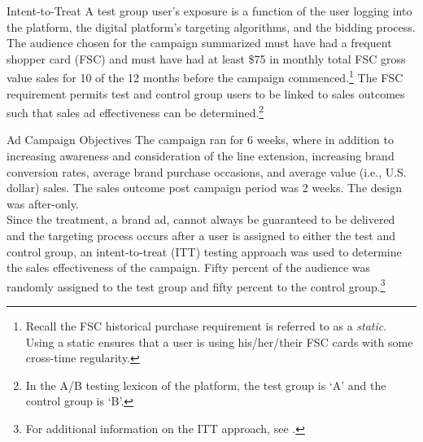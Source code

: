 \documentclass[pdf]{beamer}
\theoremstyle{remark}
\theoremstyle{definition}
\begin{document}
\begin{frame}[t]{Intent-to-Treat}
A test group user's exposure is a function of the user logging into the platform, the digital platform's targeting algorithms, and the bidding process.  \\
\vspace{1.5ex}
The audience chosen for the campaign summarized must have had a frequent shopper card (FSC) and must have had at least \$75 in monthly total FSC gross value sales for 10 of the 12 months before the campaign commenced.\footnote{Recall the FSC historical purchase requirement is referred to as a \textit{static}. Using a static ensures that a user is using his/her/their FSC cards with some cross-time regularity.}  The FSC requirement permits test and control group users to be linked to sales outcomes such that sales ad effectiveness can be determined.\footnote{In the A/B testing lexicon of the platform, the test group is `A' and the control group is `B'.} 
\end{frame}

\begin{frame}[t]{Ad Campaign Objectives}
The campaign ran for 6 weeks, where in addition to increasing awareness and consideration of the line extension, increasing brand conversion rates, average brand purchase occasions, and average value (i.e., U.S. dollar) sales.  The sales outcome post campaign period was 2 weeks. The design was after-only. \\
\vspace{1.5ex}
 Since the treatment, a brand ad, cannot always be guaranteed to be delivered and the targeting process occurs after a user is assigned to either the test and control group, an intent-to-treat (ITT) testing approach was used to determine the sales effectiveness of the campaign.  Fifty percent of the audience was randomly assigned to the test group and fifty percent to the control group.\footnote{For additional information on the ITT approach, see \cite{gordon2019}. } 
\end{frame}
\end{document}
